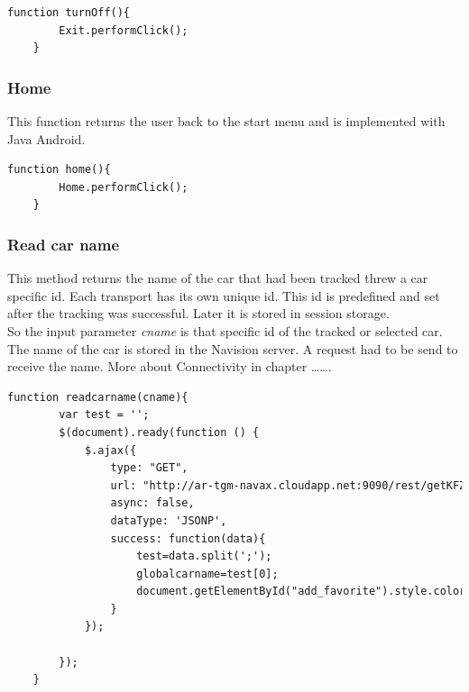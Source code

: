 \begin{lstlisting}[language=html, caption= 
Turn off funtion,captionpos=b]
function turnOff(){
        Exit.performClick();
    }
\end{lstlisting}


\subsubsection{Home}
This function returns the user back to the start menu and is implemented with Java Android.

\begin{lstlisting}[language=html, caption= 
Home function,captionpos=b]
function home(){
        Home.performClick();
    }
\end{lstlisting}


\subsubsection{Read car name}
This method returns the name of the car that had been tracked threw a car specific id. Each transport has its own unique id. This id is predefined and set after the tracking was successful. Later it is stored in session storage.
\\  
So the input parameter \textit{cname} is that specific id of the tracked or selected car. The name of the car is stored in the Navision server. A request had to be send to receive the name. More about Connectivity in chapter …….
\\


\begin{lstlisting}[language=html, caption= 
Read car name function,captionpos=b]
function readcarname(cname){
        var test = '';
        $(document).ready(function () {
            $.ajax({
                type: "GET",
                url: "http://ar-tgm-navax.cloudapp.net:9090/rest/getKFZInfo/"+cname+"/ac73f229f1fb88a8719e5f6d295bee45?callback=?",
                async: false,
                dataType: 'JSONP',
                success: function(data){
                    test=data.split(';');
                    globalcarname=test[0];
					document.getElementById("add_favorite").style.color="black";
                }
            });

        });
    }
\end{lstlisting}

